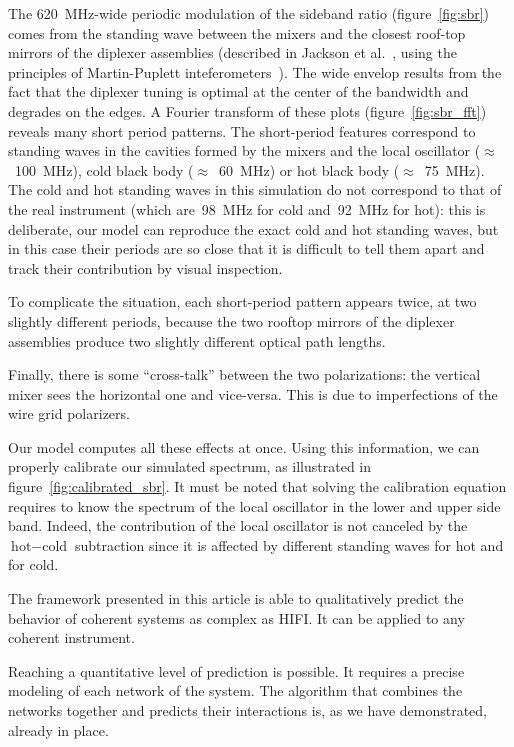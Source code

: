 \documentclass[journal]{IEEEtran}
\begin{document}
The \SI{620}{\mega\hertz}-wide periodic modulation of the sideband ratio (figure~\ref{fig:sbr}) comes from the standing wave between the mixers and the closest roof-top mirrors of the diplexer assemblies (described in Jackson et al.\ \cite{jackson2002hifi}, using the principles of Martin-Puplett inteferometers~\cite{martin1982polarizing}).
The wide envelop results from the fact that the diplexer tuning is optimal at the center of the bandwidth and degrades on the edges.
A Fourier transform of these plots (figure~\ref{fig:sbr_fft}) reveals many short period patterns.
The short-period features correspond to standing waves in the cavities formed by the mixers and
the local oscillator ($\approx$~\SI{100}{\mega\hertz}),
cold black body ($\approx$~\SI{60}{\mega\hertz}) or
hot black body ($\approx$~\SI{75}{\mega\hertz}).
The cold and hot standing waves in this simulation do not correspond to that of the real instrument (which are~\SI{98}{\mega\hertz} for cold and~\SI{92}{\mega\hertz} for hot): this is deliberate, our model can reproduce the exact cold and hot standing waves, but in this case their periods are so close that it is difficult to tell them apart and track their contribution by visual inspection.

To complicate the situation, each short-period pattern appears twice, at two slightly different periods, because the two rooftop mirrors of the diplexer assemblies produce two slightly different optical path lengths.

Finally, there is some ``cross-talk'' between the two polarizations: the vertical mixer sees the horizontal one and vice-versa.
This is due to imperfections of the wire grid polarizers.



Our model computes all these effects at once.
Using this information, we can properly calibrate our simulated spectrum, as illustrated in figure~\ref{fig:calibrated_sbr}.
It must be noted that solving the calibration equation requires to know the spectrum of the local oscillator in the lower and upper side band.
Indeed, the contribution of the local oscillator is not canceled by the $\text{hot}-\text{cold}$ subtraction since it is affected by different standing waves for hot and for cold.

The framework presented in this article is able to qualitatively predict the behavior of coherent systems as complex as HIFI.
It can be applied to any coherent instrument.

Reaching a quantitative level of prediction is possible.
It requires a precise modeling of each network of the system.
The algorithm that combines the networks together and predicts their interactions is, as we have demonstrated, already in place.
\end{document}
